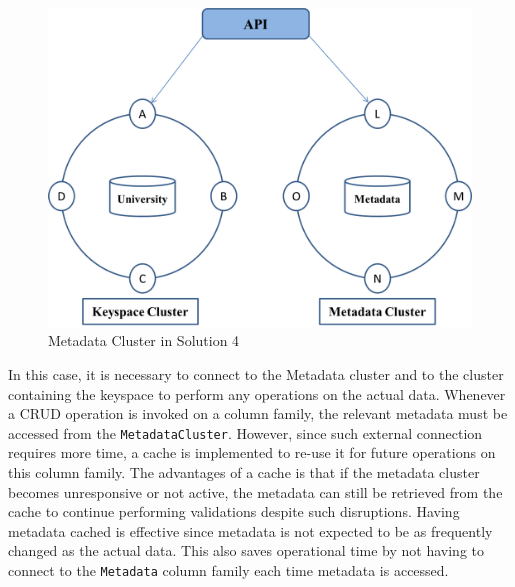 \begin{figure}[h]
	\centering
	\includegraphics[width=.6\textwidth]{./figure/Solutions/Sol4-cluster-pic.png}
	\caption{Metadata Cluster in Solution
	4}\label{fd:MetadataCluster-Solution4}
	
\end{figure}
In this case,  it is necessary to connect to the Metadata cluster and to the
cluster containing the keyspace to perform any operations on the actual data.  
Whenever a \ac{CRUD} operation is invoked on a column family,   the relevant
metadata must be accessed from the \texttt{MetadataCluster}.   
However,  since such external connection requires more time,  a cache is
implemented  to re-use it for future operations on this column family. 
The advantages of a cache is that if the metadata cluster becomes unresponsive
or not active,  the metadata can still be retrieved from the cache to continue
performing validations despite such disruptions. 
Having metadata cached is effective since metadata is not expected to be as
frequently changed as the actual data.   This also saves operational time by not
having to connect to the \texttt{Metadata} column family each time  metadata is
accessed. 




